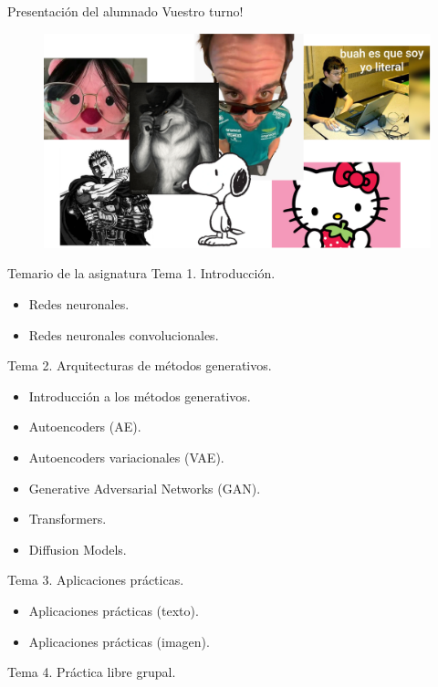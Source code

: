 \begin{frame}{Presentación del alumnado}
\centering \alert{\Large Vuestro turno!}
\begin{figure}
    \centering
    \includegraphics[width=\textwidth]{Slides/figures/Presentacion/Presentacion_Alumnos.png}
\end{figure}
\end{frame}

\begin{frame}[allowframebreaks]{Temario de la asignatura}
\alert{\Large Tema 1. Introducción.}
\begin{itemize}
\item Redes neuronales.
\item Redes neuronales convolucionales.
\end{itemize}

\alert{\Large Tema 2. Arquitecturas de métodos generativos.}
\begin{itemize}
\item Introducción a los métodos generativos.
\item Autoencoders (AE).
\item Autoencoders variacionales (VAE).
\item Generative Adversarial Networks (GAN).
\item Transformers.
\item Diffusion Models.
\end{itemize}

\framebreak

\alert{\Large Tema 3. Aplicaciones prácticas.}
\begin{itemize}
\item Aplicaciones prácticas (texto).
\item Aplicaciones prácticas (imagen).
\end{itemize}

\alert{\Large Tema 4. Práctica libre grupal.}
\end{frame}


